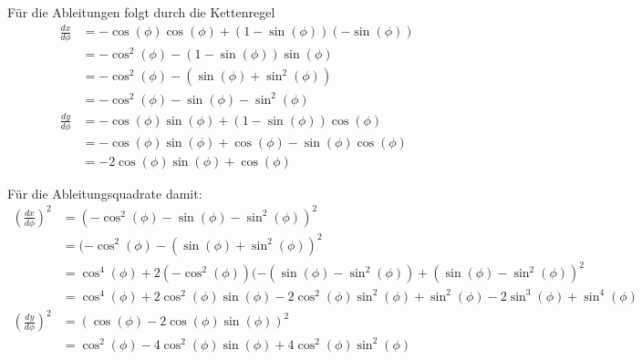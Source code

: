 \documentclass[a4paper,german,12pt,smallheadings]{scrartcl}
\begin{document}
\begin{enumerate}[a)]
    Für die Ableitungen folgt durch die Kettenregel
    \begin{align*}
      \frac{dx}{d\phi} &= -\cos(\phi)\cos(\phi) + (1-\sin(\phi))(-\sin(\phi)) \\
                       &= -\cos^2(\phi) - (1-\sin(\phi))\sin(\phi) \\
                       &= -\cos^2(\phi) - (\sin(\phi) + \sin^2(\phi)) \\
                       &= -\cos^2(\phi) - \sin(\phi) - \sin^2(\phi) \\
      \frac{dy}{d\phi} &= -\cos(\phi)\sin(\phi) + (1-\sin(\phi))\cos(\phi) \\
                       &= -\cos(\phi)\sin(\phi) + \cos(\phi) - \sin(\phi)\cos(\phi) \\
                       &= -2\cos(\phi)\sin(\phi) + \cos(\phi)
    \end{align*}

    Für die Ableitungsquadrate damit:
    \begin{align*}
      \left(\frac{dx}{d\phi}\right)^2
      &= (-\cos^2(\phi) - \sin(\phi) - \sin^2(\phi))^2 \\
      &= (-\cos^2(\phi) - (\sin(\phi)+\sin^2(\phi))^2 \\
      &= \cos^4(\phi) + 2(-\cos^2(\phi))(-(\sin(\phi)-\sin^2(\phi))+(\sin(\phi)-\sin^2(\phi))^2 \\
      &= \cos^4(\phi) + 2\cos^2(\phi)\sin(\phi)-2\cos^2(\phi)\sin^2(\phi) + \sin^2(\phi)-2\sin^3(\phi)+\sin^4(\phi) \\
      \left(\frac{dy}{d\phi}\right)^2
      &= (\cos(\phi)-2\cos(\phi)\sin(\phi))^2 \\
      &= \cos^2(\phi)-4\cos^2(\phi)\sin(\phi)+4\cos^2(\phi)\sin^2(\phi)
    \end{align*}


\end{enumerate}
\end{document}
